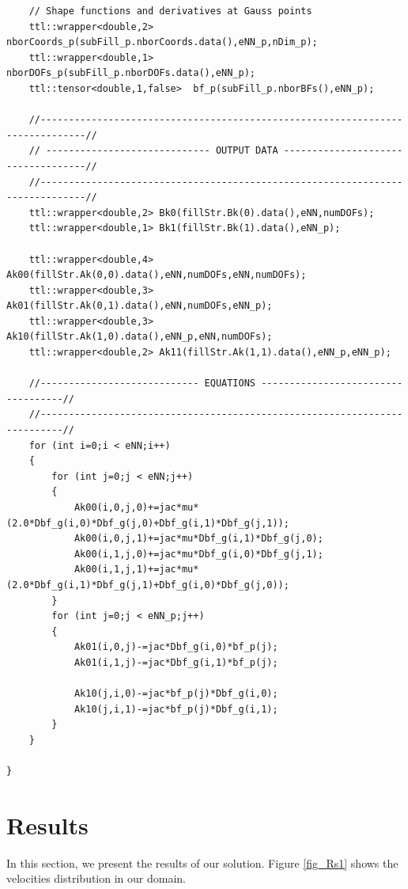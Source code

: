 \documentclass[]{article}
\begin{document}
\begin{lstlisting}
	// Shape functions and derivatives at Gauss points
	ttl::wrapper<double,2> nborCoords_p(subFill_p.nborCoords.data(),eNN_p,nDim_p);
	ttl::wrapper<double,1> nborDOFs_p(subFill_p.nborDOFs.data(),eNN_p);
	ttl::tensor<double,1,false>  bf_p(subFill_p.nborBFs(),eNN_p);
	
	//------------------------------------------------------------------------------//
	// ----------------------------- OUTPUT DATA -----------------------------------//
	//------------------------------------------------------------------------------//
	ttl::wrapper<double,2> Bk0(fillStr.Bk(0).data(),eNN,numDOFs);
	ttl::wrapper<double,1> Bk1(fillStr.Bk(1).data(),eNN_p);
	
	ttl::wrapper<double,4> Ak00(fillStr.Ak(0,0).data(),eNN,numDOFs,eNN,numDOFs);
	ttl::wrapper<double,3> Ak01(fillStr.Ak(0,1).data(),eNN,numDOFs,eNN_p);
	ttl::wrapper<double,3> Ak10(fillStr.Ak(1,0).data(),eNN_p,eNN,numDOFs);
	ttl::wrapper<double,2> Ak11(fillStr.Ak(1,1).data(),eNN_p,eNN_p);
	
	//---------------------------- EQUATIONS -----------------------------------//
	//--------------------------------------------------------------------------//
	for (int i=0;i < eNN;i++)
	{
		for (int j=0;j < eNN;j++)
		{
			Ak00(i,0,j,0)+=jac*mu*(2.0*Dbf_g(i,0)*Dbf_g(j,0)+Dbf_g(i,1)*Dbf_g(j,1));
			Ak00(i,0,j,1)+=jac*mu*Dbf_g(i,1)*Dbf_g(j,0);
			Ak00(i,1,j,0)+=jac*mu*Dbf_g(i,0)*Dbf_g(j,1);
			Ak00(i,1,j,1)+=jac*mu*(2.0*Dbf_g(i,1)*Dbf_g(j,1)+Dbf_g(i,0)*Dbf_g(j,0));
		}
		for (int j=0;j < eNN_p;j++)
		{
			Ak01(i,0,j)-=jac*Dbf_g(i,0)*bf_p(j);
			Ak01(i,1,j)-=jac*Dbf_g(i,1)*bf_p(j);
			
			Ak10(j,i,0)-=jac*bf_p(j)*Dbf_g(i,0);
			Ak10(j,i,1)-=jac*bf_p(j)*Dbf_g(i,1);
		} 
	}
	
}

\end{lstlisting}
\section{Results} \label{sec: rst}
In this section, we present the results of our solution. Figure \ref{fig_Rs1} shows the velocities distribution in our domain.
\end{document}
